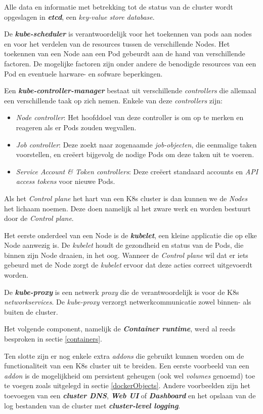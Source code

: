 Alle data en informatie met betrekking tot de status van de cluster wordt opgeslagen in \textbf{\textit{etcd}}, een \textit{key-value store database}.

De \textbf{\textit{kube-scheduler}} is verantwoordelijk voor het toekennen van pods aan nodes en voor het verdelen van de resources tussen de verschillende Nodes. Het toekennen van een Node aan een Pod gebeurdt aan de hand van verschillende factoren. De mogelijke factoren zijn onder andere de benodigde resources van een Pod en eventuele harware- en sofware beperkingen.

Een \textbf{\textit{kube-controller-manager}} bestaat uit verschillende \textit{controllers} die allemaal een verschillende taak op zich nemen. Enkele van deze \textit{controllers} zijn:
\begin{itemize}
    \item \textit{Node controller}: Het hoofddoel van deze controller is om op te merken en reageren als er Pods zouden wegvallen.
    \item \textit{Job controller}: Deze zoekt naar zogenaamde \textit{job-objecten}, die eenmalige taken voorstellen, en creëert bijgevolg de nodige Pods om deze taken uit te voeren.
    \item \textit{Service Account \& Token controllers}: Deze creëert standaard accounts en \textit{API access tokens} voor nieuwe Pods.
\end{itemize}

Als het \textit{Control plane} het hart van een K8s cluster is dan kunnen we de \textit{Nodes} het lichaam noemen. Deze doen namelijk al het zware werk en worden bestuurt door de \textit{Control plane}.

Het eerste onderdeel van een Node is de \textbf{\textit{kubelet}}, een kleine applicatie die op elke Node aanwezig is. De \textit{kubelet} houdt de gezondheid en status van de Pods, die binnen zijn Node draaien, in het oog. Wanneer de \textit{Control plane} wil dat er iets gebeurd met de Node zorgt de \textit{kubelet} ervoor dat deze acties correct uitgevoerdt worden.

De \textbf{\textit{kube-proxy}} is een netwerk \textit{proxy} die de verantwoordelijk is voor de K8s \textit{networkservices}. De \textit{kube-proxy} verzorgt netwerkcommunicatie zowel binnen- als buiten de cluster.

Het volgende component, namelijk de \textbf{\textit{Container runtime}}, werd al reeds besproken in sectie \ref{containers}.

Ten slotte zijn er nog enkele extra \textit{addons} die gebruikt kunnen worden om de functionaliteit van een K8s cluster uit te breiden. Een eerste voorbeeld van een \textit{addon} is de mogelijkheid om persistent geheugen (ook wel \textit{volumes} genoemd) toe te voegen zoals uitgelegd in sectie \ref{dockerObjects}. Andere voorbeelden zijn het toevoegen van een \textbf{\textit{cluster DNS}}, \textbf{\textit{Web UI}} of \textbf{\textit{Dashboard}} en het opslaan van de log bestanden van de cluster met \textbf{\textit{cluster-level logging}}.
\clearpage

